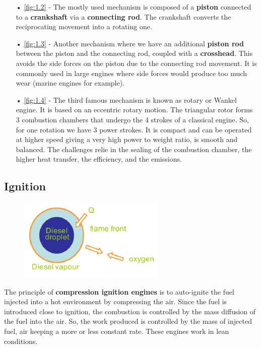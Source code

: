 		\begin{itemize}
		\item[•]\autoref{fig:1.2} - The mostly used mechanism is composed of a \textbf{piston} connected to a \textbf{crankshaft} via a \textbf{connecting rod}. The crankshaft converts the reciprocating movement into a rotating one.\\
		\item[•]\autoref{fig:1.3} - Another mechanism where we have an additional \textbf{piston rod} between the piston and the connecting rod, coupled with a \textbf{crosshead}. This avoids the side forces on the piston due to the connecting rod movement. It is commonly used in large engines where side forces would produce too much wear (marine engines for example). \\
		\item[•]\autoref{fig:1.4} - The third famous mechanism is known as rotary or Wankel engine. It is based on an eccentric rotary motion. The triangular rotor forms 3 combustion chambers that undergo the 4 strokes of a classical engine. So, for one rotation we have 3 power strokes. It is compact and can be operated at higher speed giving a very high power to weight ratio, is smooth and balanced. The challenges relie in
the sealing of the combustion chamber, the higher heat transfer, the efficiency, and the emissions.
		\end{itemize}
		
	\subsection{Ignition}
		\begin{figure}
		\vspace{-5mm}
		\includegraphics[scale=0.8]{ch1/5}
		\label{fig:1.5}
		\end{figure}
		The principle of \textbf{compression ignition engines} is to auto-ignite the fuel injected into a hot environment by compressing the air. Since the fuel is introduced close to ignition, the combustion is controlled by the mass diffusion of the fuel into the air. So, the work produced is controlled by the mass of injected fuel, air keeping a more or less constant rate. These engines work in lean conditions. \\
		
